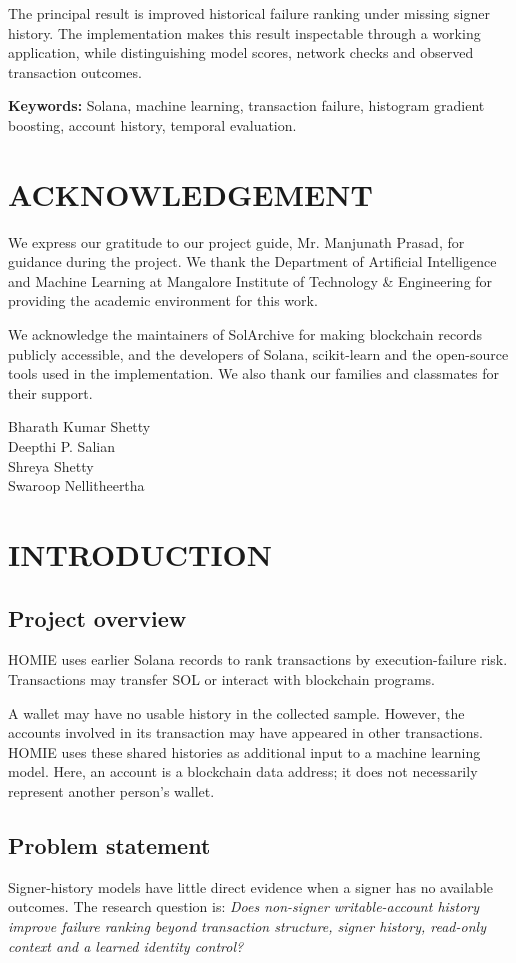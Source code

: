 \documentclass[12pt,a4paper,oneside]{report}
\newcommand{\GuideName}{Mr. Manjunath Prasad}
\begin{document}
The principal result is improved historical failure ranking under missing signer history. The implementation makes this result inspectable through a working application, while distinguishing model scores, network checks and observed transaction outcomes.

\textbf{Keywords:} Solana, machine learning, transaction failure, histogram gradient boosting, account history, temporal evaluation.
\chapter*{ACKNOWLEDGEMENT}
We express our gratitude to our project guide, \GuideName, for guidance during the project. We thank the Department of Artificial Intelligence and Machine Learning at Mangalore Institute of Technology \& Engineering for providing the academic environment for this work.

We acknowledge the maintainers of SolArchive for making blockchain records publicly accessible, and the developers of Solana, scikit-learn and the open-source tools used in the implementation. We also thank our families and classmates for their support.
\vspace{12mm}\begin{flushright}Bharath Kumar Shetty\\Deepthi P. Salian\\Shreya Shetty\\Swaroop Nellitheertha\end{flushright}
\tableofcontents\listoffigures\listoftables
\clearpage{}
\chapter{INTRODUCTION}
\section{Project overview}
HOMIE uses earlier Solana records to rank transactions by execution-failure risk. Transactions may transfer SOL or interact with blockchain programs.

A wallet may have no usable history in the collected sample. However, the accounts involved in its transaction may have appeared in other transactions. HOMIE uses these shared histories as additional input to a machine learning model. Here, an account is a blockchain data address; it does not necessarily represent another person's wallet.
\section{Problem statement}
Signer-history models have little direct evidence when a signer has no available outcomes. The research question is: \emph{Does non-signer writable-account history improve failure ranking beyond transaction structure, signer history, read-only context and a learned identity control?}
\end{document}
